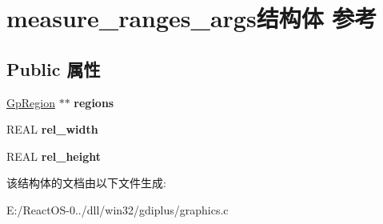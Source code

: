 \hypertarget{structmeasure__ranges__args}{}\section{measure\+\_\+ranges\+\_\+args结构体 参考}
\label{structmeasure__ranges__args}
\subsection*{Public 属性}
\begin{DoxyCompactItemize}
\item 
\mbox{\label{structmeasure__ranges__args_acd0ef61e1ab0aefbc18dc99052ba1378}} 
\hyperlink{struct_gp_region}{Gp\+Region} $\ast$$\ast$ {\bfseries regions}
\item 
\mbox{\label{structmeasure__ranges__args_aa1e3cea79f710e6a7e6d3626b9a0ca00}} 
R\+E\+AL {\bfseries rel\+\_\+width}
\item 
\mbox{\label{structmeasure__ranges__args_a44c1955ee5921921d740aac76729900f}} 
R\+E\+AL {\bfseries rel\+\_\+height}
\end{DoxyCompactItemize}


该结构体的文档由以下文件生成\+:\begin{DoxyCompactItemize}
\item 
E\+:/\+React\+O\+S-\/0../dll/win32/gdiplus/graphics.\+c\end{DoxyCompactItemize}
